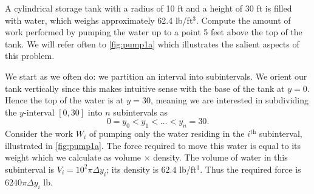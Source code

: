 \begin{example}\label{ex_pump1}%
A cylindrical storage tank with a radius of 10 ft and a height of 30 ft is filled with water, which weighs approximately 62.4 lb/ft$^3$. Compute the amount of work performed by pumping the water up to a point 5 feet above the top of the tank.
\solution
We will refer often to \autoref{fig:pump1a} which illustrates the salient aspects of this problem.


We start as we often do: we partition an interval into subintervals. We orient our tank vertically since this makes intuitive sense with the base of the tank at $y=0$. Hence the top of the water is at $y=30$, meaning we are interested in subdividing the $y$-interval $[0,30]$ into $n$ subintervals as 
\[0 = y_0 < y_1 < \dots < y_n = 30.\]
Consider the work $W_i$ of pumping only the water residing in the $i^{\text{th}}$ subinterval, illustrated in \autoref{fig:pump1a}. The force required to move this water is equal to its weight which we calculate as volume $\times $ density. The volume of water in this subinterval is 
$V_i = 10^2\pi \Delta y_i$; its density is $62.4$ lb/ft$^3$. Thus the required force is $6240\pi\Delta y_i$ lb.


\end{example}
